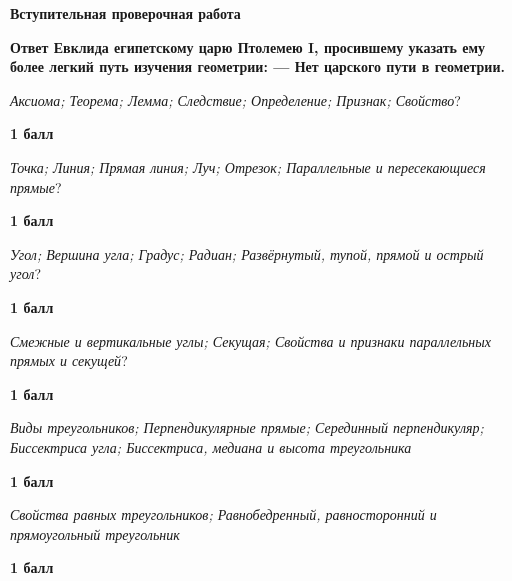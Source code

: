\centerline{\bf \Huge Вступительная проверочная работа}

\begin{flushright}
        \scriptsize{\textbf{Ответ Евклида египетскому царю Птолемею I, просившему указать ему более легкий путь изучения геометрии: — Нет царского пути в геометрии.}}
        
\end{flushright}

 \textit{Аксиома; Теорема; Лемма; Следствие; Определение; Признак; Свойство}?

\begin{flushright} \textbf{1 балл}\\ 
\end{flushright}

 \textit{Точка; Линия; Прямая линия; Луч; Отрезок; Параллельные и пересекающиеся прямые}?

\begin{flushright} \textbf{1 балл}\\ 
\end{flushright}

 \textit{Угол; Вершина угла; Градус; Радиан; Развёрнутый, тупой, прямой и острый угол}?

\begin{flushright} \textbf{1 балл}\\ 
\end{flushright}

 \textit{Смежные и вертикальные углы; Секущая; Свойства и признаки параллельных прямых и секущей}?

\begin{flushright} \textbf{1 балл}\\ 
\end{flushright}

 \textit{Виды треугольников; Перпендикулярные прямые; Серединный перпендикуляр; Биссектриса угла; Биссектриса, медиана и высота треугольника}

\begin{flushright} \textbf{1 балл}\\ 
\end{flushright}

 \textit{Свойства равных треугольников; Равнобедренный, равносторонний и прямоугольный треугольник}

\begin{flushright} \textbf{1 балл}\\ 
\end{flushright}

